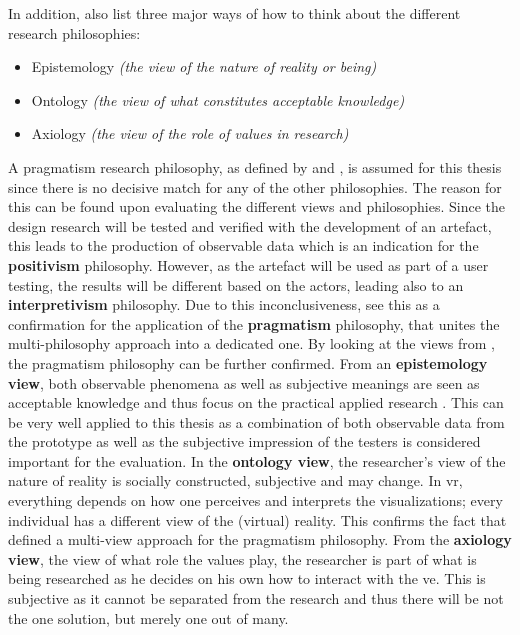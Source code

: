 In addition, \cite{Saunders2009} also list three major ways of how to think about the different research philosophies:
\begin{itemize}[noitemsep,nolistsep]
	\item Epistemology \textit{(the view of the nature of reality or being)}
	\item Ontology \textit{(the view of what constitutes acceptable knowledge)}
	\item Axiology \textit{(the view of the role of values in research)}
\end{itemize}

A pragmatism research philosophy, as defined by \cite{Vaishnavi2008} and \cite{Saunders2009}, is assumed for this thesis since there is no decisive match for any of the other philosophies. The reason for this can be found upon evaluating the different views and philosophies. Since the design research will be tested and verified with the development of an artefact, this leads to the production of observable data which is an indication for the \textbf{positivism} philosophy. However, as the artefact will be used as part of a user testing, the results will be different based on the actors, leading also to an \textbf{interpretivism} philosophy. Due to this inconclusiveness, \cite{Saunders2009} see this as a confirmation for the application of the \textbf{pragmatism} philosophy, that unites the multi-philosophy approach into a dedicated one. \newline
By looking at the views from \cite{Saunders2009}, the pragmatism philosophy can be further confirmed. From an \textbf{epistemology view}, both observable phenomena as well as subjective meanings are seen as acceptable knowledge and thus focus on the practical applied research \citep{Saunders2009}. This can be very well applied to this thesis as a combination of both observable data from the prototype as well as the subjective impression of the testers is considered important for the evaluation. In the \textbf{ontology view}, the researcher's view of the nature of reality is socially constructed, subjective and may change. In \gls{vr}, everything depends on how one perceives and interprets the visualizations; every individual has a different view of the (virtual) reality. This confirms the fact that \cite{Saunders2009} defined a multi-view approach for the pragmatism philosophy. From the \textbf{axiology view}, the view of what role the values play, the researcher is part of what is being researched as he decides on his own how to interact with the \gls{ve}. This is subjective as it cannot be separated from the research and thus there will be not the one solution, but merely one out of many. 



